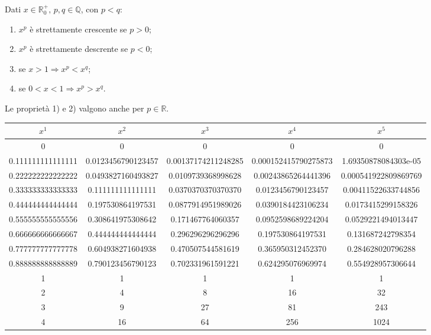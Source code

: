 \begin{property}
    Dati $x\in\mathbb R_0^+,\, p,q\in\mathbb Q$, con $p<q$:
    \begin{enumerate}
        \item $x^p$ è strettamente crescente se $p>0$;
        \item $x^p$ è strettamente descrente se $p<0$;
        \item se $x>1\Rightarrow x^p<x^q$;
        \item se $0<x<1\Rightarrow x^p>x^q$.
    \end{enumerate}
\end{property}

Le proprietà 1) e 2) valgono anche per $p\in\mathbb R$.

\begin{landscape}
\begin{table}
    \centering
    \begin{tabular}{|c|c|c|c|c|}
    \hline
        $x^1$ & $x^2$ & $x^3$ & $x^4$ & $x^5$\\
        \hline
        0	& 0	& 0	& 0	& 0	\\
        0.111111111111111	& 0.0123456790123457	& 0.00137174211248285	& 0.000152415790275873	& 1.69350878084303e-05 \\
        0.222222222222222	& 0.0493827160493827	& 0.0109739368998628	& 0.00243865264441396	& 0.000541922809869769\\
        0.333333333333333	& 0.111111111111111	& 0.0370370370370370	& 0.0123456790123457	& 0.00411522633744856\\
        0.444444444444444	& 0.197530864197531	& 0.0877914951989026	& 0.0390184423106234	& 0.0173415299158326\\
        0.555555555555556	& 0.308641975308642	& 0.171467764060357	& 0.0952598689224204	& 0.0529221494013447\\
        0.666666666666667	& 0.444444444444444	& 0.296296296296296	& 0.197530864197531	& 0.131687242798354	\\
        0.777777777777778	& 0.604938271604938	& 0.470507544581619	& 0.365950312452370	& 0.284628020796288	\\
        0.888888888888889	& 0.790123456790123	& 0.702331961591221	& 0.624295076969974	& 0.554928957306644	\\
        1	& 1	& 1	& 1	& 1	\\
        2	& 4	& 8	& 16	& 32\\
        3	& 9	& 27	& 81	& 243\\
        4	& 16	& 64	& 256	& 1024\\

\end{tabular}
\end{table}
\end{landscape}
